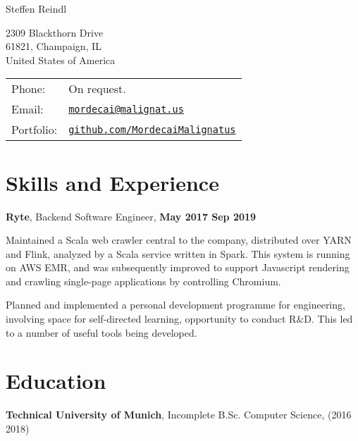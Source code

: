 \documentclass[a4paper]{article}
\def\name{Steffen Reindl}
\renewenvironment{itemize}{
  \begin{list}{}{
      \setlength{\leftmargin}{1.5em}
      \setlength{\itemsep}{10pt}
  }
}{
  \end{list}
}
\begin{document}
{\huge \name}
\vspace{0.25in}

\begin{minipage}{0.45\linewidth}
  2309 Blackthorn Drive\\
  61821, Champaign, IL\\
  United States of America
\end{minipage}
\begin{minipage}{0.45\linewidth}
  \begin{tabular}{ll}
    Phone: & On request. \\
    Email: & \href{mailto:mordecai@malignat.us}{\tt mordecai@malignat.us} \\
    Portfolio: & \href{https://github.com/MordecaiMalignatus/}{\tt github.com/MordecaiMalignatus}
  \end{tabular}
\end{minipage}

\section*{Skills and Experience}

\begin{itemize}
\item \textbf{Ryte}, Backend Software Engineer, \textbf{May 2017 {\textendash} Sep 2019}
        \begin{itemize}
            \item Maintained a Scala web crawler central to the company,
              distributed over YARN and Flink, analyzed by a Scala service
              written in Spark. This system is running on AWS EMR, and was
              subsequently improved to support Javascript rendering and crawling
              single-page applications by controlling Chromium.
            \item Planned and implemented a personal development programme for
              engineering, involving space for self-directed learning,
              opportunity to conduct R\&D. This led to a number of useful tools
              being developed.
        \end{itemize}
\end{itemize}

\section*{Education}

\begin{itemize}
  \item \textbf{Technical University of Munich}, Incomplete B.Sc. Computer Science,  (2016
    {\textendash} 2018)
\end{itemize}
\end{document}
